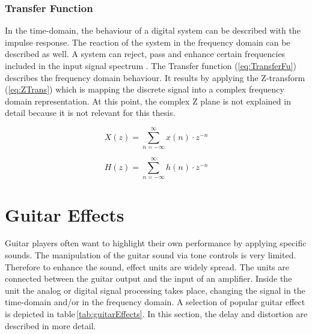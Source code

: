 \subsubsection{Transfer Function}

In the time-domain, the behaviour of a digital system can be described with the impulse response.
The reaction of the system in the frequency domain can be described as well.
A system can reject, pass and enhance certain frequencies included in the input signal spectrum \cite[p.\,21]{Zolzer:2002}.
The Transfer function (\ref{eq:TransferFu}) describes the frequency domain behaviour.
It results by applying the Z-transform (\ref{eq:ZTrans}) which is mapping the discrete signal into a complex frequency domain representation. At this point, the complex Z plane is not explained in detail because it is not relevant for this thesis.


\begin{equation}
X(z) = \sum_{n=-\infty}^{\infty} x(n)\cdot z^{-n}
\label{eq:ZTrans}
\end{equation}

\begin{equation}
H(z) = \sum_{n=-\infty}^{\infty} h(n)\cdot z^{-n}
\label{eq:TransferFu}
\end{equation}

\section{Guitar Effects}

Guitar players often want to highlight their own performance by applying specific sounds.
The manipulation of the guitar sound via tone controls is very limited.
Therefore to enhance the sound, effect units are widely spread.
The units are connected between the guitar output and the input of an amplifier.
Inside the unit the analog or digital signal processing takes place, changing the signal in the time-domain and/or in the frequency domain. A selection of popular guitar effect is depicted in table\,\ref{tab:guitarEffects}. In this section, the delay and distortion are described in more detail.


